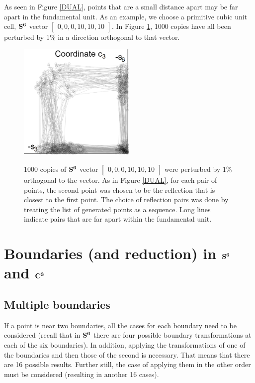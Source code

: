 \documentclass[preprint]{iucr}              %
\numberwithin{equation}{section}
\newcommand{\SVI}[0]{$\bf{S^{6}}$}
\newcommand{\CIII}[0]{$\bf{C^{3}}$}
\begin{document}
As seen in Figure \ref{DUAL}, points that are a small distance apart may
be far apart in the fundamental unit. As an example, we choose a primitive
cubic unit cell, \SVI{} vector $\begin{bmatrix}{ 0, 0, 0, 10, 10, 10}\end{bmatrix}$. In Figure \ref{perturbed},
1000 copies have all been perturbed by 1\% in a direction orthogonal to that vector.

\begin{figure}
	\includegraphics[width=0.5\textwidth]{perturbed}\label{perturbed}

	\caption{1000 copies of \SVI{} vector $\begin{bmatrix}{ 0, 0, 0, 10, 10, 10}\end{bmatrix}$ were 
	perturbed by 1\% orthogonal to the vector. As in Figure \ref{DUAL}, for
	each pair of points, the second point was chosen to be the reflection that
	is closest to the first point. The choice of reflection pairs was done by
	treating the list of generated points as a sequence. Long lines indicate
	pairs that are far apart within the fundamental unit. }
\end{figure}
\section{Boundaries (and reduction) in \SVI{} and \CIII{}}



	\subsection{Multiple boundaries}
	
	If a point is near two boundaries, all the cases for each boundary need to be considered (recall
	that in \SVI{} there are four possible boundary transformations at
	each of the six boundaries).
	In addition, applying the transformations of one of the boundaries
	and then those of the second is necessary. That means that
	there are 16 possible results. Further still, the 
	case of applying them in the other order must be considered (resulting
	in another 16 cases).
	
\end{document}
